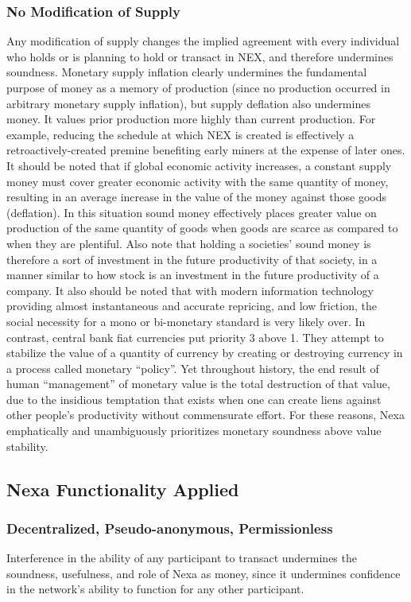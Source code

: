 \documentclass[a4paper, 11pt]{article}
\begin{document}
\subsubsection{No Modification of Supply}
Any modification of supply changes the implied agreement with every individual who holds or is planning to hold or transact in NEX, and therefore undermines soundness.  Monetary supply inflation clearly undermines the fundamental purpose of money as a memory of production (since no production occurred in arbitrary monetary supply inflation), but supply deflation also undermines money.  It values prior production more highly than current production.  For example, reducing the schedule at which NEX is created is effectively a retroactively-created premine benefiting early miners at the expense of later ones.
It should be noted that if global economic activity increases, a constant supply money must cover greater economic activity with the same quantity of money, resulting in an average increase in the value of the money against those goods (deflation).  In this situation sound money effectively places greater value on production of the same quantity of goods when goods are scarce as compared to when they are plentiful.  Also note that holding a societies’ sound money is therefore a sort of investment in the future productivity of that society, in a manner similar to how stock is an investment in the future productivity of a company.  It also should be noted that with modern information technology providing almost instantaneous and accurate repricing, and low friction, the social necessity for a mono or bi-monetary standard is very likely over.
 In contrast, central bank fiat currencies put priority 3 above 1.  They attempt to stabilize the value of a quantity of currency by creating or destroying currency in a process called monetary “policy”.  Yet throughout history, the end result of human “management” of monetary value is the total destruction of that value, due to the insidious temptation that exists when one can create liens against other people’s productivity without commensurate effort.   
For these reasons, Nexa emphatically and unambiguously prioritizes monetary soundness above value stability.

\subsection{Nexa Functionality Applied}
\subsubsection{Decentralized, Pseudo-anonymous, Permissionless}
Interference in the ability of any participant to transact undermines the soundness, usefulness, and role of Nexa as money, since it undermines confidence in the network’s ability to function for any other participant.  
\end{document}
